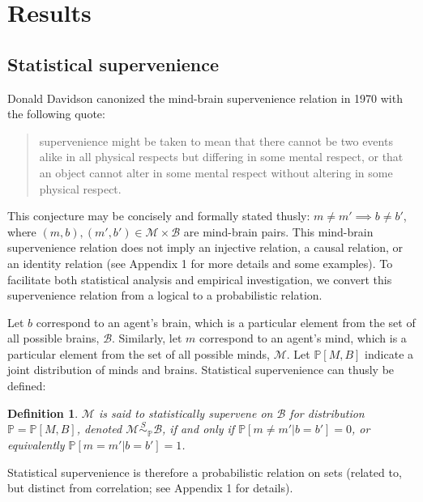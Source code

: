 \documentclass{article}
\newcommand{\mB}{\mathcal{B}}
\newcommand{\mM}{\mathcal{M}}
\newcommand{\PP}{\mathbb{P}}           %
\providecommand{\mc}[1]{\mathcal{#1}}
\newtheorem{defi}{Definition}
\begin{document}


\section*{Results}

\subsection*{Statistical supervenience} %

Donald Davidson canonized the mind-brain supervenience relation in 1970 with the following quote: \cite{Davidson70}
\begin{quotation}
\noindent supervenience might be taken to mean that there cannot be two events alike in all physical respects but differing in some mental respect, or that an object cannot alter in some mental respect without altering in some physical respect.
\end{quotation}


\noindent This conjecture may be concisely and formally stated thusly:  $m \neq m' \implies b \neq b'$, where $(m,b), (m',b') \in \mc{M} \times \mc{B}$ are mind-brain pairs.  This mind-brain supervenience relation does not imply an injective relation, a causal relation, or an identity relation (see Appendix 1 for more details and some examples).  To facilitate both statistical analysis and empirical investigation, we convert this supervenience relation from a logical to a probabilistic relation.  

Let $b$ correspond to an agent's brain, which is a particular element from the set of all possible brains, $\mB$. Similarly, let $m$ correspond to an agent's mind, which is a particular element from the set of all possible minds, $\mM$.  Let $\PP[M,B]$ indicate a joint distribution of minds and brains. Statistical supervenience can thusly be defined:

\begin{defi}
\label{def1} 
$\mM$ is said to \textit{statistically supervene} on $\mB$ for distribution $\PP=\PP[M,B]$, denoted $\mM \overset{S}{\sim}_\PP \mB$, if and only if $\PP[m \neq m' | b=b']=0$, or equivalently $\PP[m = m' | b = b']=1$. 
\end{defi}
\noindent Statistical supervenience is therefore a probabilistic relation on sets (related to, but distinct from correlation; see Appendix 1 for details).  
\end{document}
